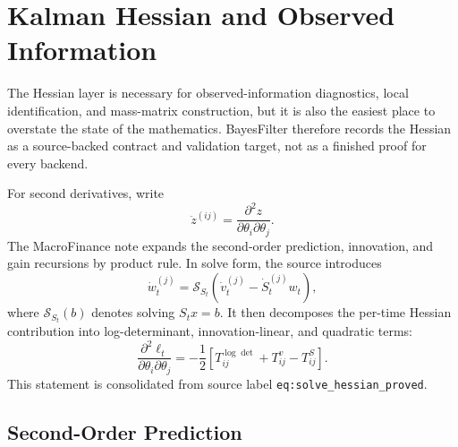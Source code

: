 \chapter{Kalman Hessian and Observed Information}
\label{ch:bf-kalman-hessian}

The Hessian layer is necessary for observed-information diagnostics, local
identification, and mass-matrix construction, but it is also the easiest place
to overstate the state of the mathematics.  BayesFilter therefore records the
Hessian as a source-backed contract and validation target, not as a finished
proof for every backend.

For second derivatives, write
\[
  \ddot z^{(ij)}
  =
  \frac{\partial^2 z}{\partial\theta_i\partial\theta_j}.
\]
The MacroFinance note expands the second-order prediction, innovation, and gain
recursions by product rule.  In solve form, the source introduces
\begin{equation}
\label{eq:bf-solve-hessian-w-dot}
  \dot w_t^{(j)}
  =
  \mathcal{S}_{S_t}\left(\dot v_t^{(j)}-\dot S_t^{(j)}w_t\right),
\end{equation}
where $\mathcal{S}_{S_t}(b)$ denotes solving $S_tx=b$.  It then decomposes the
per-time Hessian contribution into log-determinant, innovation-linear, and
quadratic terms:
\begin{equation}
\label{eq:bf-solve-hessian-summary}
  \frac{\partial^2\ell_t}{\partial\theta_i\partial\theta_j}
  =
  -\frac{1}{2}
  \left[
    T_{ij}^{\log\det}+T_{ij}^{v}-T_{ij}^{S}
  \right].
\end{equation}
This statement is consolidated from source label
\texttt{eq:solve\_hessian\_proved}.

\section{Second-Order Prediction}
\label{sec:bf-hessian-prediction}

